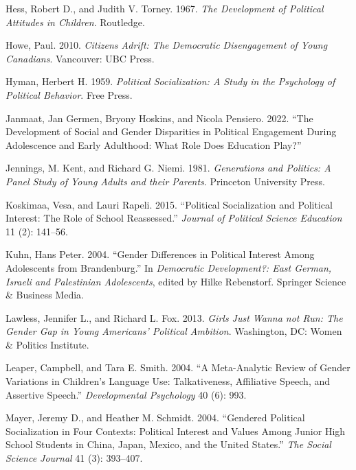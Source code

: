 \documentclass[
  letterpaper,
  DIV=11,
  numbers=noendperiod]{scrreprt}
\newlength{\cslhangindent}
\newlength{\cslentryspacingunit} %
\newenvironment{CSLReferences}[2] %
 {%
  \setlength{\parindent}{0pt}
  \ifodd #1
  \let\oldpar\par
  \def\par{\hangindent=\cslhangindent\oldpar}
  \fi
  \setlength{\parskip}{#2\cslentryspacingunit}
 }%
 {}
\begin{document}
\begin{CSLReferences}{1}{0}
\leavevmode{}%
Hess, Robert D., and Judith V. Torney. 1967. \emph{{The Development of
Political Attitudes in Children}}. Routledge.

\leavevmode{}%
Howe, Paul. 2010. \emph{{Citizens Adrift: The Democratic Disengagement
of Young Canadians}}. Vancouver: UBC Press.

\leavevmode{}%
Hyman, Herbert H. 1959. \emph{{Political Socialization: A Study in the
Psychology of Political Behavior}}. Free Press.

\leavevmode{}%
Janmaat, Jan Germen, Bryony Hoskins, and Nicola Pensiero. 2022. {``{The
Development of Social and Gender Disparities in Political Engagement
During Adolescence and Early Adulthood: What Role Does Education
Play?}''}

\leavevmode{}%
Jennings, M. Kent, and Richard G. Niemi. 1981. \emph{{Generations and
Politics: A Panel Study of Young Adults and their Parents}}. Princeton
University Press.

\leavevmode{}%
Koskimaa, Vesa, and Lauri Rapeli. 2015. {``{Political Socialization and
Political Interest: The Role of School Reassessed}.''} \emph{Journal of
Political Science Education} 11 (2): 141--56.

\leavevmode{}%
Kuhn, Hans Peter. 2004. {``{Gender Differences in Political Interest
Among Adolescents from Brandenburg}.''} In \emph{{Democratic
Development?: East German, Israeli and Palestinian Adolescents}}, edited
by Hilke Rebenstorf. Springer Science \& Business Media.

\leavevmode{}%
Lawless, Jennifer L., and Richard L. Fox. 2013. \emph{{Girls Just Wanna
not Run: The Gender Gap in Young Americans' Political Ambition}}.
Washington, DC: Women \& Politics Institute.

\leavevmode{}%
Leaper, Campbell, and Tara E. Smith. 2004. {``{A Meta-Analytic Review of
Gender Variations in Children's Language Use: Talkativeness, Affiliative
Speech, and Assertive Speech}.''} \emph{Developmental Psychology} 40
(6): 993.

\leavevmode{}%
Mayer, Jeremy D., and Heather M. Schmidt. 2004. {``{Gendered Political
Socialization in Four Contexts: Political Interest and Values Among
Junior High School Students in China, Japan, Mexico, and the United
States}.''} \emph{The Social Science Journal} 41 (3): 393--407.


\end{CSLReferences}
\end{document}
